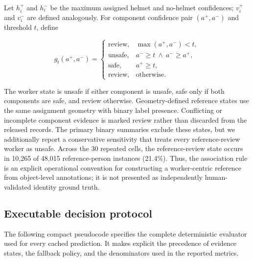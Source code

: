 \documentclass[iicol,pdflatex,sn-mathphys-num]{sn-jnl}
\begin{document}
Let $h_i^+$ and $h_i^-$ be the maximum assigned helmet and no-helmet confidences; $v_i^+$ and $v_i^-$ are defined analogously. For component confidence pair $(a^+,a^-)$ and threshold $t$, define

\begin{equation}
g_t(a^+,a^-)=
\begin{cases}
\mathrm{review}, & \max(a^+,a^-)<t,\\
\mathrm{unsafe}, & a^-\geq t\ \wedge\ a^-\geq a^+,\\
\mathrm{safe}, & a^+\geq t,\\
\mathrm{review}, & \text{otherwise}.
\end{cases}
\end{equation}

The worker state is unsafe if either component is unsafe, safe only if both components are safe, and review otherwise. Geometry-defined reference states use the same assignment geometry with binary label presence. Conflicting or incomplete component evidence is marked review rather than discarded from the released records. The primary binary summaries exclude these states, but we additionally report a conservative sensitivity that treats every reference-review worker as unsafe. Across the 30 repeated cells, the reference-review state occurs in 10,265 of 48,015 reference-person instances (21.4\%). Thus, the association rule is an explicit operational convention for constructing a worker-centric reference from object-level annotations; it is not presented as independently human-validated identity ground truth.

\subsection{Executable decision protocol}
The following compact pseudocode specifies the complete deterministic evaluator used for every cached prediction. It makes explicit the precedence of evidence states, the fallback policy, and the denominators used in the reported metrics.
\end{document}
